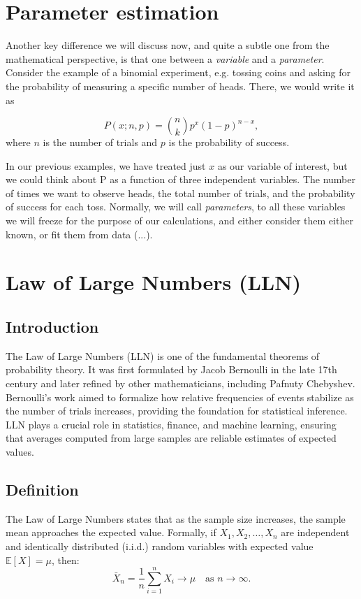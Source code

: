 \documentclass{book}
\begin{document}
\section{Parameter estimation}
Another key difference we will discuss now, and quite a subtle one from the mathematical perspective, is that one between a \textit{variable} and a \textit{parameter}. Consider the example of a binomial experiment, e.g. tossing coins and asking for the probability of measuring a specific number of heads. There, we would write it as 

\begin{equation}
    P(x; n, p) = \binom{n}{k} p^x (1-p)^{n-x},
\end{equation}
where $n$ is the number of trials and $p$ is the probability of success.

In our previous examples, we have treated just $x$ as our variable of interest, but we could think about P as a function of three independent variables. The number of times we want to observe heads, the total number of trials, and the probability of success for each toss. Normally, we will call \textit{parameters}, to all these variables we will freeze for the purpose of our calculations, and either consider them either known, or fit them from data (...).
 
\section{Law of Large Numbers (LLN)}

\subsection{Introduction}
The Law of Large Numbers (LLN) is one of the fundamental theorems of probability theory. It was first formulated by Jacob Bernoulli in the late 17th century and later refined by other mathematicians, including Pafnuty Chebyshev. Bernoulli's work aimed to formalize how relative frequencies of events stabilize as the number of trials increases, providing the foundation for statistical inference. LLN plays a crucial role in statistics, finance, and machine learning, ensuring that averages computed from large samples are reliable estimates of expected values.

\subsection{Definition}
The Law of Large Numbers states that as the sample size increases, the sample mean approaches the expected value. Formally, if $X_1, X_2, \dots, X_n$ are independent and identically distributed (i.i.d.) random variables with expected value $\mathbb{E}[X] = \mu$, then:
\begin{equation}
    \bar{X}_n = \frac{1}{n} \sum_{i=1}^{n} X_i \to \mu \quad \text{as } n \to \infty.
\end{equation}
\end{document}
